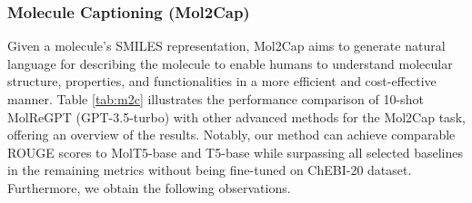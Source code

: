 \documentclass{article}
\theoremstyle{plain}
\theoremstyle{definition}
\theoremstyle{remark}
\begin{document}
\subsubsection{Molecule Captioning (Mol2Cap)}
Given a molecule's SMILES representation, Mol2Cap aims to generate natural language for describing the molecule to enable humans to understand molecular structure, properties, and functionalities in a more efficient and cost-effective manner. 
Table \ref{tab:m2c} illustrates the performance comparison of 10-shot MolReGPT (GPT-3.5-turbo) with other advanced methods for the Mol2Cap task, offering an overview of the results. Notably, our method can achieve comparable ROUGE scores to MolT5-base and T5-base while surpassing all selected baselines in the remaining metrics without being fine-tuned on ChEBI-20 dataset. Furthermore, we obtain the following observations. 

\begin{table*}[htb]
    \centering
        \caption{The performance of molecule captioning on ChEBI-20 dataset. Experimental results for Transformer, T5-base, and MolT5-base are retrieved from ~\cite{edwards-etal-2022-translation}. The \textbf{best} scores are in bold, and the \underline{second-best} scores are underlined.}
    \label{tab:m2c}
\end{table*}
\end{document}
